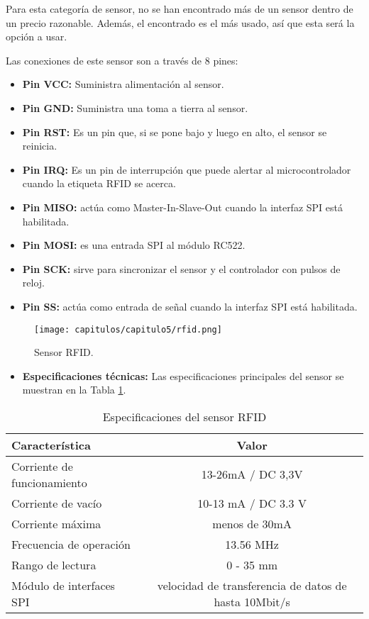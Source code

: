 Para esta categoría de sensor, no se han encontrado más de un sensor dentro de un precio razonable. Además, el encontrado es el más usado, así que esta será la opción a usar.

Las conexiones de este sensor son a través de 8 pines:

\begin{itemize}
    \item \textbf{Pin VCC:} Suministra alimentación al sensor.
    \item \textbf{Pin GND:} Suministra una toma a tierra al sensor.
    \item \textbf{Pin RST:} Es un pin que, si se pone bajo y luego en alto, el sensor se reinicia.
    \item \textbf{Pin IRQ:} Es un pin de interrupción que puede alertar al microcontrolador cuando la etiqueta RFID se acerca.
    \item \textbf{Pin MISO:} actúa como Master-In-Slave-Out cuando la interfaz SPI está habilitada.
    \item \textbf{Pin MOSI:} es una entrada SPI al módulo RC522.
    \item \textbf{Pin SCK:} sirve para sincronizar el sensor y el controlador con pulsos de reloj.
    \item \textbf{Pin SS:} actúa como entrada de señal cuando la interfaz SPI está habilitada.
\end{itemize}

\begin{figure}[h] 
    \centering
    \texttt{[image: capitulos/capitulo5/rfid.png]}
    \caption{Sensor RFID.}
    \label{fig:rfid}
\end{figure}

\begin{itemize}
    \item \textbf{Especificaciones técnicas:} Las especificaciones principales del sensor se muestran en la Tabla \ref{tab:rfidiesp}.
\end{itemize}

\begin{table}[h]
    \centering
    \begin{tabular}{|l|c|}
        \rowcolor[gray]{.5}
        \hline
            \color{white}Característica&\color{white}Valor  \\
        \hline
            Corriente de funcionamiento & 13-26mA / DC 3,3V   \\
        \hline    
            Corriente de vacío & 10-13 mA / DC 3.3 V   \\
        \hline    
            Corriente máxima & menos de 30mA   \\
        \hline    
            Frecuencia de operación & 13.56 MHz   \\
        \hline    
            Rango de lectura & 0 - 35 mm   \\
        \hline   
            Módulo de interfaces SPI & velocidad de transferencia de datos de hasta 10Mbit/s   \\
         \hline
    \end{tabular}
    \caption{Especificaciones del sensor RFID}
    \label{tab:rfidiesp}
\end{table}


